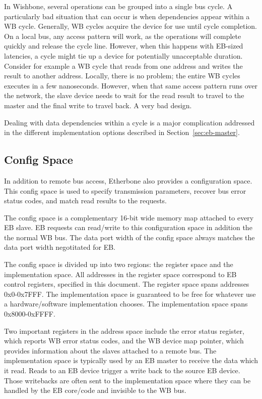 \documentclass{article}
\begin{document}
In Wishbone, several operations can be grouped into a single bus cycle.
A particularly bad situation that can occur is when dependencies appear within a WB cycle.
Generally, WB cycles acquire the device for use until cycle completion.
On a local bus, any access pattern will work, 
as the operations will complete quickly and release the cycle line.
However, when this happens with EB-sized latencies, 
a cycle might tie up a device for potentially unacceptable duration.
Consider for example a WB cycle that reads from one address 
and writes the result to another address.
Locally, there is no problem; the entire WB cycles executes in a few
nanoseconds.
However, when that same access pattern runs over the network,
the slave device needs to wait for the read result to travel to the master and the final write to travel back.
A very bad design.

Dealing with data dependencies within a cycle is a major complication
addressed in the different implementation options described in
Section~\ref{sec:eb-master}.

\subsection{Config Space}

In addition to remote bus access, 
Etherbone also provides a configuration space.
This config space is used to specify transmission parameters,
recover bus error status codes,
and match read results to the requests.

The config space is a complementary 16-bit wide memory map attached to every EB slave.
EB requests can read/write to this configuration space in addition the the normal WB bus.
The data port width of the config space always matches the data port width negotitated for EB.

The config space is divided up into two regions: the register space and the implementation space.
All addresses in the register space correspond to EB control registers,
specified in this document.
The register space spans addresses 0x0-0x7FFF.
The implementation space is guaranteed to be free for whatever use
a hardware/software implementation chooses.
The implementation space spans 0x8000-0xFFFF.

Two important registers in the address space include the error status
register, which reports WB error status codes, and the WB device map pointer,
which provides information about the slaves attached to a remote bus.
The implementation space is typically used by an EB master to receive
the data which it read.
Reads to an EB device trigger a write back to the source EB device.
Those writebacks are often sent to the implementation space 
where they can be handled by the EB core/code and invisible to the WB bus.
\end{document}
